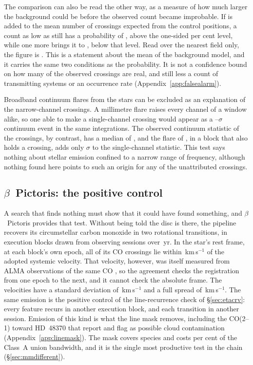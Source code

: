 The comparison can also be read the other way, as a measure of how much
larger the background could be before the observed count became improbable.
If \CeAddLim{} is added to the mean number of crossings expected from the
control positions, a count as low as \CeObs{} still has a probability of
\CeProbAtLim, above the one-sided \CeAlphaPct{} per cent level, while one
more brings it to \CeProbAboveLim, below that level. Read over the nearest field only, the
figure is \FrNarrowAddLim. This is a statement about the mean of
the background model, and it carries the same two conditions as the
probability. It is not a confidence bound on how many of the observed
crossings are real, and still less a count of transmitting systems or an
occurrence rate (Appendix~\ref{app:falsealarm}).

Broadband continuum flares from the stars can be excluded as an
explanation of the narrow-channel crossings. A millimetre flare raises every
channel of a window alike, so one able to make a single-channel crossing
would appear as a \FlPredLo--\FlPredHi$\sigma$ continuum event in the same
integrations. The observed continuum statistic of the crossings, by
contrast, has a median of \FlObsMed, and the \FlEgStar{} flare of
\citet{MacGregor2020}, in a block that also holds a crossing, adds only
\FlEgContrib$\sigma$ to the single-channel statistic. This test says nothing
about stellar emission confined to a narrow range of frequency, although
nothing found here points to such an origin for any of the unattributed
crossings.

\subsection{$\beta$~Pictoris: the positive control}
\label{sec:bpicval}

A search that finds nothing must show that it could have found something,
and $\beta$~Pictoris provides that test. Without being told the disc is
there, the pipeline recovers its circumstellar carbon monoxide
\citep{Dent2014,Matra2017} in two rotational transitions, in
\CsBpCoBlocks{} execution blocks drawn from \CsBpCoSess{} observing sessions
over \BpBaselineYr\,yr. In the star's rest frame, at each block's own epoch,
all \BpicPanelNCo{} of its CO crossings lie within \BpicDvCoHi\,km\,s$^{-1}$ of the
adopted systemic velocity. That velocity, however, was itself measured from
ALMA observations of the same CO \citep{Matra2017}, so the agreement checks
the registration from one epoch to the next, and it cannot check the
absolute frame.
The \LrBpNVel{} velocities have a standard deviation of
\LrBpDvSd\,km\,s$^{-1}$ and a full spread of \LrBpDvRange\,km\,s$^{-1}$. The same emission is the positive control of the
line-recurrence check of \S\ref{sec:etacrv}: every feature recurs in another
execution block, and each transition in another session. Emission of this
kind is what the line mask removes, including the CO(2--1) toward
HD~48370 that \citet{Cataldi2023} report and flag as possible cloud
contamination (Appendix~\ref{app:linemask}). The mask covers \FrNSpec{}
species and costs \MkMaskAPct{} per cent of the Class~A union bandwidth, and
it is the single most productive test in the chain
(\S\ref{sec:mmdifferent}).


